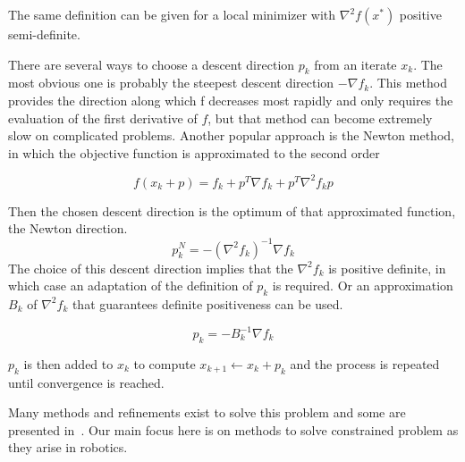 The same definition can be given for a local minimizer with $\nabla^2f(x^*)$ positive semi-definite.

There are several ways to choose a descent direction $p_k$ from an iterate $x_k$. The
most obvious one is probably the steepest descent direction $-\nabla f_k$. This
method provides the direction along which f decreases most rapidly and only
requires the evaluation of the first derivative of $f$, but that method can
become extremely slow on complicated problems. Another popular approach is the
Newton method, in which the objective function is approximated to the second
order

\begin{equation}
  f(x_k+p) = f_k + p^T\nabla f_k + p^T\nabla^2f_k p
\end{equation}

Then the chosen descent direction is the optimum of that approximated function,
the Newton direction.
\begin{equation}
  p^N_k = -{(\nabla^2 f_k)}^{-1} \nabla f_k
\end{equation}
The choice of this descent direction implies that the $\nabla^2f_k$ is positive
definite, in which case an adaptation of the definition of $p_k$ is required. Or
an approximation $B_k$ of $\nabla^2f_k$ that guarantees definite positiveness can be
used. %

\begin{equation}
  p_k = -B_k^{-1}\nabla f_k
\end{equation}

$p_k$ is then added to $x_k$ to compute $x_{k+1} \leftarrow x_k + p_k$ and the process is repeated until convergence is reached.

Many methods and refinements exist to solve this problem and some are presented in~\cite{nocedal:book:2006}.
Our main focus here is on methods to solve constrained problem as they arise in robotics.



